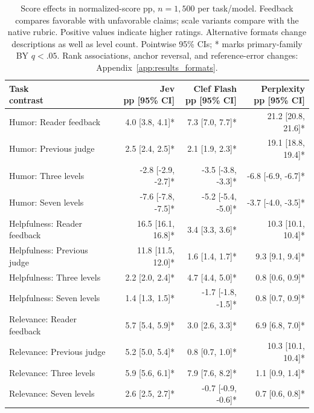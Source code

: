 \begin{table}[t]
\centering\footnotesize
\setlength{\tabcolsep}{3.5pt}
\begin{tabular}{@{}lrrr@{}}
\toprule
\shortstack[l]{Task\\{}contrast} & \shortstack[l]{Jev\\{}pp [95\% CI]} & \shortstack[l]{Clef Flash\\{}pp [95\% CI]} & \shortstack[l]{Perplexity\\{}pp [95\% CI]} \\
\midrule
Humor: Reader feedback & 4.0 [3.8, 4.1]* & 7.3 [7.0, 7.7]* & 21.2 [20.8, 21.6]* \\
Humor: Previous judge & 2.5 [2.4, 2.5]* & 2.1 [1.9, 2.3]* & 19.1 [18.8, 19.4]* \\
Humor: Three levels & -2.8 [-2.9, -2.7]* & -3.5 [-3.8, -3.3]* & -6.8 [-6.9, -6.7]* \\
Humor: Seven levels & -7.6 [-7.8, -7.5]* & -5.2 [-5.4, -5.0]* & -3.7 [-4.0, -3.5]* \\
Helpfulness: Reader feedback & 16.5 [16.1, 16.8]* & 3.4 [3.3, 3.6]* & 10.3 [10.1, 10.4]* \\
Helpfulness: Previous judge & 11.8 [11.5, 12.0]* & 1.6 [1.4, 1.7]* & 9.3 [9.1, 9.4]* \\
Helpfulness: Three levels & 2.2 [2.0, 2.4]* & 4.7 [4.4, 5.0]* & 0.8 [0.6, 0.9]* \\
Helpfulness: Seven levels & 1.4 [1.3, 1.5]* & -1.7 [-1.8, -1.5]* & 0.8 [0.7, 0.9]* \\
Relevance: Reader feedback & 5.7 [5.4, 5.9]* & 3.0 [2.6, 3.3]* & 6.9 [6.8, 7.0]* \\
Relevance: Previous judge & 5.2 [5.0, 5.4]* & 0.8 [0.7, 1.0]* & 10.3 [10.1, 10.4]* \\
Relevance: Three levels & 5.9 [5.6, 6.1]* & 7.9 [7.6, 8.2]* & 1.1 [0.9, 1.4]* \\
Relevance: Seven levels & 2.6 [2.5, 2.7]* & -0.7 [-0.9, -0.6]* & 0.7 [0.6, 0.8]* \\
\bottomrule
\end{tabular}
\caption{Score effects in normalized-score pp, $n=1{,}500$ per task/model. Feedback compares favorable with unfavorable claims; scale variants compare with the native rubric. Positive values indicate higher ratings. Alternative formats change descriptions as well as level count. Pointwise 95\% CIs; * marks primary-family BY $q<.05$. Rank associations, anchor reversal, and reference-error changes: Appendix~\ref{app:results_formats}.}
\label{tab:results_score_effects}
\end{table}
